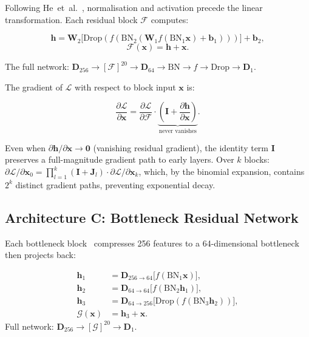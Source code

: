 \documentclass[10pt,conference,letterpaper]{IEEEtran}
\begin{document}
Following He~et~al.~\cite{he2016identity}, normalisation and activation precede
the linear transformation. Each residual block $\mathcal{F}$ computes:
\begin{tcolorbox}[eqbox]
\[
  \bm{h} = \bm{W}_2\bigl[\mathrm{Drop}(f(\mathrm{BN}_2(\bm{W}_1 f(\mathrm{BN}_1\bm{x})+\bm{b}_1)))\bigr]+\bm{b}_2,
\]
\[
  \mathcal{F}(\bm{x}) = \bm{h} + \bm{x}.
\]
\end{tcolorbox}

The full network: $\mathbf{D}_{256}\to[\mathcal{F}]^{20}\to
\mathbf{D}_{64}\to\mathrm{BN}\to f\to\mathrm{Drop}\to\mathbf{D}_1$.

The gradient of $\mathcal{L}$ with respect to block input $\bm{x}$ is:
\begin{tcolorbox}[eqbox]
\[
  \frac{\partial\mathcal{L}}{\partial\bm{x}}
  = \frac{\partial\mathcal{L}}{\partial\mathcal{F}}\!\cdot\!
    \underbrace{\left(\bm{I}+\frac{\partial\bm{h}}{\partial\bm{x}}\right)}_{\text{never vanishes}}.
\]
\end{tcolorbox}

Even when $\partial\bm{h}/\partial\bm{x}\to\bm{0}$ (vanishing residual
gradient), the identity term $\bm{I}$ preserves a full-magnitude gradient
path to early layers. Over $k$ blocks:
$\partial\mathcal{L}/\partial\bm{x}_0 = \prod_{l=1}^{k}(\bm{I}+\bm{J}_l)
\cdot\partial\mathcal{L}/\partial\bm{x}_k$,
which, by the binomial expansion, contains $2^k$ distinct gradient paths,
preventing exponential decay.

\subsection{Architecture C: Bottleneck Residual Network}

Each bottleneck block~\cite{he2015resnet} compresses 256 features to a 64-dimensional
bottleneck then projects back:
\begin{tcolorbox}[eqbox]
\begin{align*}
  \bm{h}_1 &= \mathbf{D}_{256\to64}\bigl[f(\mathrm{BN}_1\bm{x})\bigr], \\
  \bm{h}_2 &= \mathbf{D}_{64\to64}\bigl[f(\mathrm{BN}_2\bm{h}_1)\bigr], \\
  \bm{h}_3 &= \mathbf{D}_{64\to256}\bigl[\mathrm{Drop}(f(\mathrm{BN}_3\bm{h}_2))\bigr], \\
  \mathcal{G}(\bm{x}) &= \bm{h}_3+\bm{x}.
\end{align*}
Full network: $\mathbf{D}_{256}\to[\mathcal{G}]^{20}\to\mathbf{D}_1$.
\end{tcolorbox}
\end{document}

